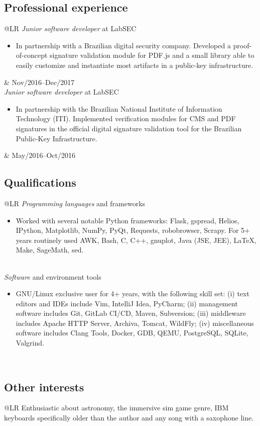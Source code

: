 \documentclass[12pt]{article}
\makeatletter
\newenvironment{datetable}
  {\newcolumntype{R}{>{\raggedleft\arraybackslash}p{0.14\textwidth}}
   \newcolumntype{L}{p{0.84\textwidth}}
   \begin{tabular}{@{\hspace{0mm}}LR}}
  {\end{tabular}}
\newenvironment{contenttable}[1]
  {\subsection*{#1}
   \begin{datetable}}
  {\end{datetable}}
\makeatother
\begin{document}
\begin{contenttable}{Professional experience}
  \textit{Junior software developer} at LabSEC
  \begin{itemize}
    \item In partnership with a Brazilian digital security company. Developed a
        proof-of-concept signature validation module for PDF.js and a small
          library able to easily customize and instantiate most artifacts in a
          public-key infrastructure.
  \end{itemize} & Nov/2016--Dec/2017 \\

  \textit{Junior software developer} at LabSEC
  \begin{itemize}
    \item In partnership with the Brazilian National Institute of Information
        Technology (ITI). Implemented verification modules for CMS and PDF
          signatures in the official digital signature validation tool for the
          Brazilian Public-Key Infrastructure.
  \end{itemize} & May/2016--Oct/2016 \\[-4mm]
\end{contenttable}

\begin{contenttable}{Qualifications}
  \textit{Programming languages} and frameworks
  \begin{itemize}
    \item Worked with several notable Python frameworks: Flask, gspread,
        Helios, IPython, Matplotlib, NumPy, PyQt, Requests, robobrowser,
          Scrapy. For 5+ years routinely used AWK, Bash, C, C++, gnuplot, Java
          (JSE, JEE), \LaTeX{}, Make, SageMath, sed.
  \end{itemize} \\
  \textit{Software} and environment tools
  \begin{itemize}
    \item GNU/Linux exclusive user for 4+ years, with the following skill set:
        (i) text editors and IDEs include Vim, IntelliJ Idea, PyCharm; (ii)
          management software includes Git, GitLab CI/CD, Maven, Subversion;
          (iii) middleware includes Apache HTTP Server, Archiva, Tomcat,
          WildFly; (iv) miscellaneous software includes Clang Tools, Docker,
          GDB, QEMU, PostgreSQL, SQLite, Valgrind.
  \end{itemize} \\[-4mm]
\end{contenttable}

\begin{contenttable}{Other interests}
  Enthusiastic about astronomy, the immersive sim game genre, IBM keyboards
    specifically older than the author and any song with a saxophone line. \\
\end{contenttable}


\nobibliography{\jobname}
\end{document}
